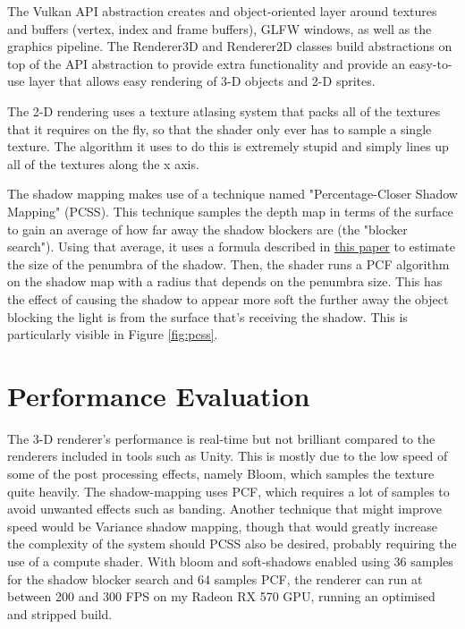 \documentclass[8pt]{article}
\begin{document}
\begin{multicols}{2}
			The Vulkan API abstraction creates and object-oriented layer around
			textures and buffers (vertex, index and frame buffers), GLFW windows,
			as well as the graphics pipeline. The Renderer3D and Renderer2D classes
			build abstractions on top of the API abstraction to provide extra
			functionality and provide an easy-to-use layer that allows easy rendering
			of 3-D objects and 2-D sprites.

			The 2-D rendering uses a texture atlasing system that packs all of the
			textures that it requires on the fly, so that the shader only ever has
			to sample a single texture. The algorithm it uses to do this is extremely
			stupid and simply lines up all of the textures along the x axis.

			The shadow mapping makes use of a technique named "Percentage-Closer
			Shadow Mapping" (PCSS). This technique samples the depth map in terms of
			the surface to gain an average of how far away the shadow blockers are
			(the "blocker search"). Using that average, it uses a formula described in
			\href{https://developer.download.nvidia.com/shaderlibrary/docs/shadow_PCSS.pdf}{this paper} 
			to estimate the size of the penumbra of the shadow. Then, the shader runs
			a PCF algorithm on the shadow map with a radius that depends on the
			penumbra size. This has the effect of causing the shadow to appear
			more soft the further away the object blocking the light is from the
			surface that's receiving the shadow. This is particularly visible in
			Figure \ref{fig:pcss}.

			\section{Performance Evaluation}
			The 3-D renderer's performance is real-time but not brilliant compared
			to the renderers included in tools such as Unity. This is mostly due
			to the low speed of some of the post processing effects, namely Bloom,
			which samples the texture quite heavily. The shadow-mapping uses PCF,
			which requires a lot of samples to avoid unwanted effects such as
			banding. Another technique that might improve speed would be Variance
			shadow mapping, though that would greatly increase the complexity of
			the system should PCSS also be desired, probably requiring the use of
			a compute shader. With bloom and soft-shadows enabled using 36 samples
			for the shadow blocker search and 64 samples PCF, the renderer can run
			at between 200 and 300 FPS on my Radeon RX 570 GPU, running an optimised
			and stripped build.
		\end{multicols}
\end{document}
